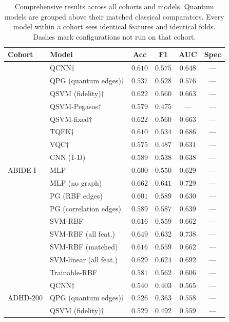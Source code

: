 \begin{table}[t]
\caption{Comprehensive results across all cohorts and models. Quantum models are grouped above their matched classical comparators. Every model within a cohort sees identical features and identical folds. Dashes mark configurations not run on that cohort.}
\label{tab:comprehensive}
\centering
\small
\renewcommand{\arraystretch}{1.15}
\begin{tabular}{|l|l|c|c|c|c|}
\hline
\textbf{Cohort} & \textbf{Model} & \textbf{Acc} & \textbf{F1} & \textbf{AUC} & \textbf{Spec} \\
\hline
 \multirow{17}{*}{ABIDE-I} & QCNN$\dagger$ & $0.610$ & $0.575$ & $0.648$ & --- \\
  & QPG (quantum edges)$\dagger$ & $0.537$ & $0.528$ & $0.576$ & --- \\
  & QSVM (fidelity)$\dagger$ & $0.622$ & $0.560$ & $0.663$ & --- \\
  & QSVM-Pegasos$\dagger$ & $0.579$ & $0.475$ & --- & --- \\
  & QSVM-fixed$\dagger$ & $0.622$ & $0.560$ & $0.663$ & --- \\
  & TQEK$\dagger$ & $0.610$ & $0.534$ & $0.686$ & --- \\
  & VQC$\dagger$ & $0.575$ & $0.487$ & $0.631$ & --- \\
  & CNN (1-D) & $0.589$ & $0.538$ & $0.638$ & --- \\
  & MLP & $0.600$ & $0.550$ & $0.629$ & --- \\
  & MLP (no graph) & $0.662$ & $0.641$ & $0.729$ & --- \\
  & PG (RBF edges) & $0.601$ & $0.589$ & $0.630$ & --- \\
  & PG (correlation edges) & $0.589$ & $0.587$ & $0.639$ & --- \\
  & SVM-RBF & $0.616$ & $0.559$ & $0.662$ & --- \\
  & SVM-RBF (all feat.) & $0.649$ & $0.632$ & $0.738$ & --- \\
  & SVM-RBF (matched) & $0.616$ & $0.559$ & $0.662$ & --- \\
  & SVM-linear (all feat.) & $0.629$ & $0.624$ & $0.692$ & --- \\
  & Trainable-RBF & $0.581$ & $0.562$ & $0.606$ & --- \\
\hline
 \multirow{17}{*}{ADHD-200} & QCNN$\dagger$ & $0.540$ & $0.403$ & $0.565$ & --- \\
  & QPG (quantum edges)$\dagger$ & $0.526$ & $0.363$ & $0.558$ & --- \\
  & QSVM (fidelity)$\dagger$ & $0.529$ & $0.492$ & $0.559$ & --- \\

\end{tabular}
\end{table}
